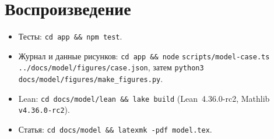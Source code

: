 \documentclass[11pt,a4paper]{article}
\theoremstyle{definition}
\theoremstyle{remark}
\begin{document}
\section{Воспроизведение}
\begin{itemize}
\item Тесты: \texttt{cd app \&\& npm test}.
\item Журнал и данные рисунков: \texttt{cd app \&\& node} \nolinkurl{scripts/model-case.ts} \nolinkurl{../docs/model/figures/case.json},
затем \texttt{python3 docs/model/figures/make\_figures.py}.
\item Lean: \texttt{cd docs/model/lean \&\& lake build} (Lean~4.36.0-rc2, Mathlib \texttt{v4.36.0-rc2}).
\item Статья: \texttt{cd docs/model \&\& latexmk -pdf model.tex}.
\end{itemize}
\end{document}
